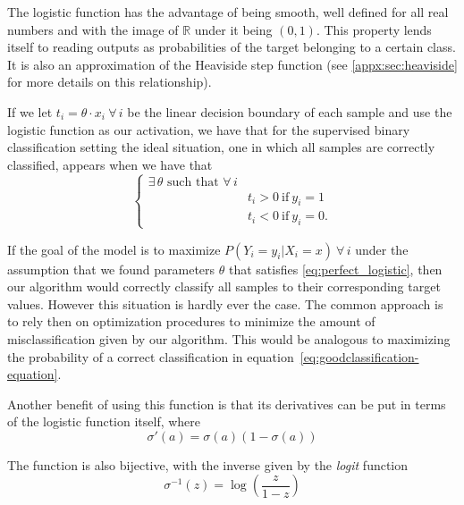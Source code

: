 The logistic function has the advantage of being smooth, well defined for all real numbers and with the image of $\mathbb{R}$ under it being $(0,1)$.
This property lends itself to reading outputs as probabilities of the target belonging to a certain class.
It is also an approximation of the Heaviside step function (see \cref{appx:sec:heaviside} for more details on this relationship).

If we let $t_i = \theta \cdot x_i \ \forall \, i $ be the linear decision boundary of each sample and use the logistic function as our activation, we have that for the supervised binary classification setting the ideal situation, one in which all samples are correctly classified, appears when we have that %
\begin{equation}\label{eq:perfect_logistic}
\begin{cases}
\exists \, \theta \mbox{ such that } \forall \, i \\
& t_i >0 \ \mbox{if} \ y_i=1 \\
& t_i <0 \ \mbox{if} \ y_i=0.
\end{cases}
\end{equation}


If the goal of the model is to maximize $P(Y_i = y_i | X_i = x) \ \forall \, i$
under the assumption that we found parameters $\theta$ that satisfies \cref{eq:perfect_logistic}, then our algorithm would correctly classify all samples to their corresponding target values.
However this situation is hardly ever the case.
The common approach is to rely then on optimization procedures to minimize the amount of misclassification given by our algorithm.
This would be analogous to maximizing the probability of a correct classification in equation~\eqref{eq:goodclassification-equation}.


Another benefit of using this function is that its derivatives can be put in terms of the logistic function itself, where
\begin{equation}
\sigma '(a) = \sigma(a)( 1 - \sigma(a) )
\label{eq:derivativeLogisticFunction}
\end{equation}

The function is also bijective, with the inverse given by the \textit{logit} function
\begin{equation}
\sigma^{-1}(z) = \log \left( \frac{z}{1 - z} \right)
\label{eq:logitFunction}
\end{equation}

